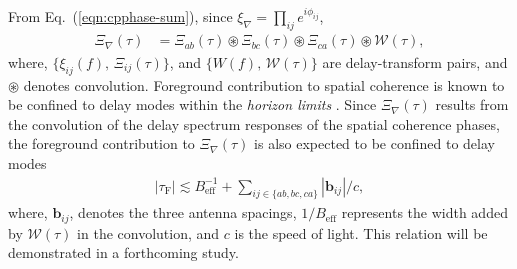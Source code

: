 \documentclass[
reprint,
superscriptaddress,
amsmath,
amssymb,
aps,
prd
]{revtex4-1}
\begin{document}
From Eq.~(\ref{eqn:cpphase-sum}), since $\xi_\nabla = \prod_{ij} e^{i\phi_{ij}}$,
\begin{align}
\Xi_\nabla(\tau) &= \Xi_{ab}(\tau)\circledast \Xi_{bc}(\tau)\circledast \Xi_{ca}(\tau)\circledast \mathcal{W}(\tau), \label{eqn:cpdspec-convolution}
\end{align}
where, $\{\xi_{ij}(f),\,\Xi_{ij}(\tau)\}$, and $\{W(f),\,\mathcal{W}(\tau)\}$ are delay-transform pairs, and $\circledast$ denotes convolution.  Foreground contribution to spatial coherence is known to be confined to delay modes within the {\it horizon limits} 
\cite{bow09,liu09,liu14a,liu14b,dat10,liu11,gho12,mor12,par12b,tro12,ved12,dil13,pob13,thy13,thy15a,thy15b,thy16,dil14}. %
Since $\Xi_\nabla(\tau)$ results from the convolution of the delay spectrum responses of the spatial coherence phases, the foreground contribution to $\Xi_\nabla(\tau)$ is also expected to be confined to delay modes
\begin{align}
  |\tau_\textrm{F}| \lesssim B_\textrm{eff}^{-1} + \sum_{ij\in\{ab,bc,ca\}}|\bm{b}_{ij}|/c, \label{eqn:cp-FG-wedge}
\end{align}
where, $\bm{b}_{ij}$, denotes the three antenna spacings, $1/B_\textrm{eff}$ represents the width added by $\mathcal{W}(\tau)$ in the convolution, and $c$ is the speed of light. This relation will be demonstrated in a forthcoming study. 

\end{document}

